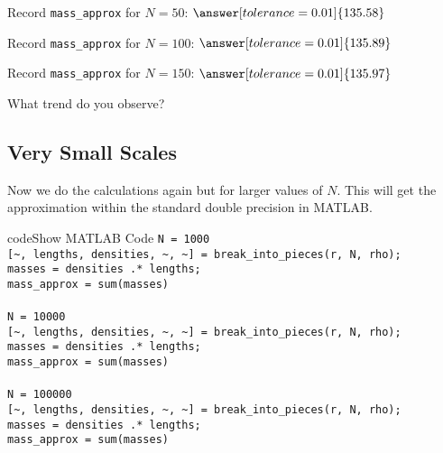 \documentclass{ximera}
\begin{document}
\begin{problem}
Record \texttt{mass\_approx} for $N=50$: $\answer[tolerance=0.01]{135.58}$

Record \texttt{mass\_approx} for $N=100$: $\answer[tolerance=0.01]{135.89}$

Record \texttt{mass\_approx} for $N=150$: $\answer[tolerance=0.01]{135.97}$

What trend do you observe? \begin{multipleChoice}
\end{multipleChoice}
\end{problem}

\subsection*{Very Small Scales}

Now we do the calculations again but for larger values of $N$. This will get the approximation within the standard double precision in MATLAB.

\begin{expandable}{code}{Show MATLAB Code}
\texttt{N = 1000}\\
\texttt{[\textasciitilde, lengths, densities, \textasciitilde, \textasciitilde] = break\_into\_pieces(r, N, rho);}\\
\texttt{masses = densities .* lengths;}\\
\texttt{mass\_approx = sum(masses)}\\
\\
\texttt{N = 10000}\\
\texttt{[\textasciitilde, lengths, densities, \textasciitilde, \textasciitilde] = break\_into\_pieces(r, N, rho);}\\
\texttt{masses = densities .* lengths;}\\
\texttt{mass\_approx = sum(masses)}\\
\\
\texttt{N = 100000}\\
\texttt{[\textasciitilde, lengths, densities, \textasciitilde, \textasciitilde] = break\_into\_pieces(r, N, rho);}\\
\texttt{masses = densities .* lengths;}\\
\texttt{mass\_approx = sum(masses)}
\end{expandable}
\end{document}
